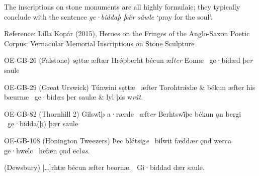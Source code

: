 The inscriptions on stone monuments are all highly formulaic; they typically conclude with the sentence \emph{ge·biddaþ þǽr sâwle} ‘pray for the soul’.

Reference: Lilla Kopár (2015), Heroes on the Fringes of the Anglo-Saxon Poetic Corpus: Vernacular Memorial Inscriptions on Stone Sculpture

OE-GB-26 (Falstone)
\emph{s}ęttæ æftær Hrǿþberht
bécun æf\emph{ter} Eomæ \hld\ ge·bidæd þe\emph{r} saule

OE-GB-29 (Great Urswick)
Túnwini sęttæ \hld\ æfter Torohtrǽdæ &
békun æfter his bæurnæ \hld\ ge·bidæs þer saulæ &
lyl þis w\emph{rât.}

OE-GB-82 (Thornhill 2)
Gilswi̇́þ a·rærde \hld\ æft\emph{er} Berhtswi̇́þe
békun ǫn bergi \hld\ ge·bidda(þ) þær saule

OE-GB-108 (Honington Tweezers)
Þec blǿtsig\emph{e} \hld\ bilwit fæddæ\emph{r}
ǫnd werca ge·hwelc \hld\ hefæn ǫnd ecl\emph{as}.

(Dewsbury)
[\dots]rhtæ
bécun æfter beornæ. \hld\ Gi·biddad dær saule.
